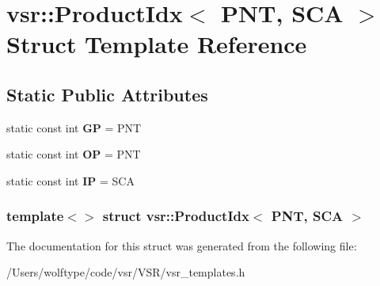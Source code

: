 \hypertarget{structvsr_1_1_product_idx_3_01_p_n_t_00_01_s_c_a_01_4}{\section{vsr\-:\-:Product\-Idx$<$ P\-N\-T, S\-C\-A $>$ Struct Template Reference}
\label{structvsr_1_1_product_idx_3_01_p_n_t_00_01_s_c_a_01_4}
}
\subsection*{Static Public Attributes}
\begin{DoxyCompactItemize}
\item 
\hypertarget{structvsr_1_1_product_idx_3_01_p_n_t_00_01_s_c_a_01_4_a78b7628cdc65a66cfefaeb433b66cec4}{static const int {\bfseries G\-P} = P\-N\-T}\label{structvsr_1_1_product_idx_3_01_p_n_t_00_01_s_c_a_01_4_a78b7628cdc65a66cfefaeb433b66cec4}

\item 
\hypertarget{structvsr_1_1_product_idx_3_01_p_n_t_00_01_s_c_a_01_4_a12e4854f674c67614eccffcf74bd15f3}{static const int {\bfseries O\-P} = P\-N\-T}\label{structvsr_1_1_product_idx_3_01_p_n_t_00_01_s_c_a_01_4_a12e4854f674c67614eccffcf74bd15f3}

\item 
\hypertarget{structvsr_1_1_product_idx_3_01_p_n_t_00_01_s_c_a_01_4_af9db1a41561d4a6c671d9128790d615e}{static const int {\bfseries I\-P} = S\-C\-A}\label{structvsr_1_1_product_idx_3_01_p_n_t_00_01_s_c_a_01_4_af9db1a41561d4a6c671d9128790d615e}

\end{DoxyCompactItemize}
\subsubsection*{template$<$$>$ struct vsr\-::\-Product\-Idx$<$ P\-N\-T, S\-C\-A $>$}



The documentation for this struct was generated from the following file\-:\begin{DoxyCompactItemize}
\item 
/\-Users/wolftype/code/vsr/\-V\-S\-R/vsr\-\_\-templates.\-h\end{DoxyCompactItemize}
